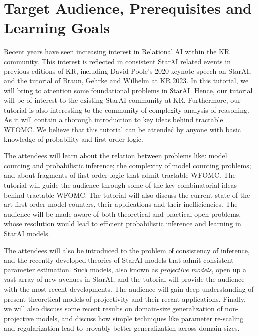 \section{Target Audience, Prerequisites and Learning Goals}
Recent years have seen increasing interest in Relational AI within the KR community. This interest is reflected in consistent StarAI related events in previous editions of KR, including David Poole's 2020 keynote speech  on StarAI, and the tutorial of Braun, Gehrke and Wilhelm at KR 2023. In this tutorial, we will bring to attention some foundational problems in StarAI. Hence, our tutorial will be of interest to the existing StarAI community at KR. Furthermore, our tutorial is also interesting to the community of complexity analysis of reasoning. As it will contain a thorough introduction to key ideas behind tractable WFOMC. We believe that this tutorial can be attended by anyone with basic knowledge of probability and first order logic. 

The attendees will learn about the relation between problems like: model counting and probabilistic inference; the complexity of model counting problems; and about fragments of first order logic that admit tractable WFOMC. The tutorial will guide the audience through some of the key combinatorial ideas behind tractable WFOMC. The tutorial will also discuss the current state-of-the-art first-order model counters, their applications and their inefficiencies. The audience will be made aware of both  theoretical and practical open-problems, whose resolution would lead to efficient probabilistic inference and learning in StarAI models.




The attendees will also be introduced to the problem of consistency of inference, and the recently developed theories of StarAI models that admit consistent parameter estimation. Such models, also known as \emph{projective models}, open up a vast array of new avenues in StarAI, and the tutorial will provide the audience with the most recent developments. The audience will gain deep understanding of present theoretical models of projectivity and their recent applications. Finally, we will also discuss some recent results on domain-size generalization of non-projective models, and discuss how simple techniques like parameter re-scaling and regularization lead to provably better generalization across domain sizes.


